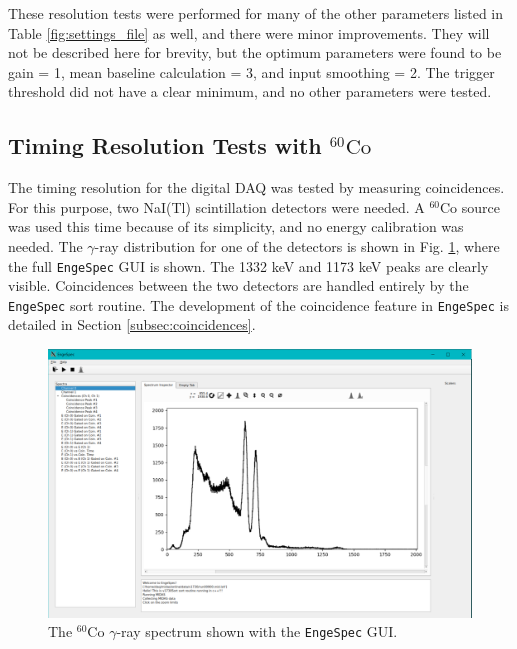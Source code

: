 These resolution tests were performed for many of the other parameters listed in Table \ref{fig:settings_file} as well, and there were minor improvements. They will not be described here for brevity, but the optimum parameters were found to be gain = 1, mean baseline calculation = 3, and input smoothing = 2. The trigger threshold did not have a clear minimum, and no other parameters were tested.

\subsection{Timing Resolution Tests with $^{60}\mathrm{Co}$} \label{subsec:timing_resolution}

The timing resolution for the digital DAQ was tested by measuring coincidences. For this purpose, two NaI(Tl) scintillation detectors were needed. A $^{60}$Co source was used this time because of its simplicity, and no energy calibration was needed. The $\gamma$-ray distribution for one of the detectors is shown in Fig. \ref{fig:Hist_60Co}, where the full \texttt{EngeSpec} GUI is shown. The 1332 keV and 1173 keV peaks are clearly visible. Coincidences between the two detectors are handled entirely by the \texttt{EngeSpec} sort routine. The development of the coincidence feature in \texttt{EngeSpec} is detailed in Section \ref{subsec:coincidences}.

\begin{figure}[t]
\centering
\includegraphics[width=6.5in]{Chapter-5/figs/Histogram_Co60.png}
\caption{\label{fig:Hist_60Co}The $^{60}$Co $\gamma$-ray spectrum shown with the \texttt{EngeSpec} GUI.}
\end{figure}

